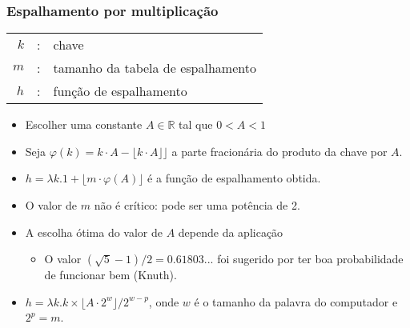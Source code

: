 \documentclass{beamer}
\begin{document}
\begin{frame}

  \frametitle{Espalhamento por multiplicação}

  \begin{tabular}{rcl}
    $k$ & : & chave \\
    $m$ & : & tamanho da tabela de espalhamento \\
    $h$ & : & função de espalhamento \\
  \end{tabular}
  
  \begin{itemize}
    
  \item Escolher uma constante $A \in \mathbb{R}$ tal que $0 < A < 1$

  \item Seja $\varphi(k) = k \cdot A - \lfloor k \cdot A \rfloor \rfloor$ a parte
    fracionária do produto da chave por $A$.

  \item $h = \lambda k . 1 + \lfloor m \cdot \varphi(A) \rfloor$ é a função de espalhamento obtida.

  \item O valor de $m$ não é crítico: pode ser uma potência de 2.

  \item A escolha ótima do valor de $A$ depende da aplicação

    \begin{itemize}

    \item O valor $(\sqrt{5} - 1)/2 = 0.61803...$ foi sugerido por ter boa probabilidade de funcionar bem (Knuth).

    \end{itemize}

  \item $h = \lambda k . k \times \lfloor A \cdot 2^w \rfloor / 2^{w-p}$, onde $w$
    é o tamanho da palavra do computador e $2^p = m$.

  \end{itemize}

\end{frame}

\end{document}
